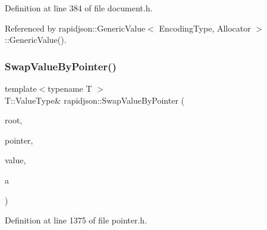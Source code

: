 Definition at line 384 of file document.\+h.


\begin{DoxyCode}{0}

\end{DoxyCode}


Referenced by rapidjson\+::\+Generic\+Value$<$ Encoding\+Type, Allocator $>$\+::\+Generic\+Value().

\mbox{\label{namespacerapidjson_af27fbadfe9c823485374a6b426e3bf1f}} 
\subsubsection{\texorpdfstring{SwapValueByPointer()}{SwapValueByPointer()}\hspace{0.1cm}{\footnotesize\ttfamily [1/4]}}
{\footnotesize\ttfamily template$<$typename T $>$ \\
T\+::\+Value\+Type\& rapidjson\+::\+Swap\+Value\+By\+Pointer (\begin{DoxyParamCaption}\item[{T \&}]{root,  }\item[{const \mbox{\hyperlink{classrapidjson_1_1_generic_pointer}{Generic\+Pointer}}$<$ typename T\+::\+Value\+Type $>$ \&}]{pointer,  }\item[{typename T\+::\+Value\+Type \&}]{value,  }\item[{typename T\+::\+Allocator\+Type \&}]{a }\end{DoxyParamCaption})}



Definition at line 1375 of file pointer.\+h.


\begin{DoxyCode}{0}

\end{DoxyCode}


